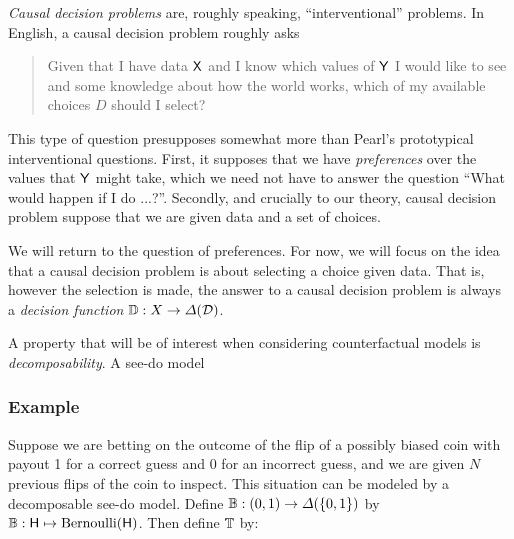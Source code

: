 \emph{Causal decision problems} are, roughly speaking, ``interventional'' problems. In English, a causal decision problem roughly asks

\begin{quote}
    Given that I have data $\mathsf{X}$ and I know which values of $\mathsf{Y}$ I would like to see and some knowledge about how the world works, which of my available choices $D$ should I select?
\end{quote}

This type of question presupposes somewhat more than Pearl's prototypical interventional questions. First, it supposes that we have \emph{preferences} over the values that $\mathsf{Y}$ might take, which we need not have to answer the question ``What would happen if I do ...?''. Secondly, and crucially to our theory, causal decision problem suppose that we are given data and a set of choices. 

We will return to the question of preferences. For now, we will focus on the idea that a causal decision problem is about selecting a choice given data. That is, however the selection is made, the answer to a causal decision problem is always a \emph{decision function} $\mathbb{D}:X\to \Delta(\mathcal{D})$.

A property that will be of interest when considering counterfactual models is \emph{decomposability}. A see-do model 



\subsubsection{Example}

Suppose we are betting on the outcome of the flip of a possibly biased coin with payout 1 for a correct guess and 0 for an incorrect guess, and we are given $N$ previous flips of the coin to inspect. This situation can be modeled by a decomposable see-do model. Define $\mathbb{B}:(0,1)\to \Delta(\{0,1\})$ by $\mathbb{B}:\mathsf{H}\mapsto \mathrm{Bernoulli}(\mathsf{H})$. Then define ${\mathbb{T}}$ by:

